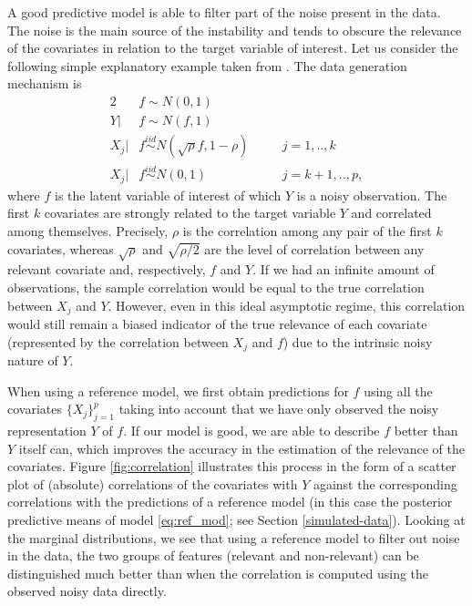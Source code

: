 \documentclass[american,]{article}
\theoremstyle{definition}
\begin{document}
A good predictive model is able to filter part of the noise present in
the data. The noise is the main source of the instability and tends to
obscure the relevance of the covariates in relation to the target
variable of interest. Let us consider the following simple
explanatory example taken from \cite{paper:projpred}. The data
generation mechanism is
\begin{alignat}{2} \label{eq:simulated_data}
     &f\sim N(0,1) && \nonumber \\ 
     Y|&f\sim N(f,1) && \\
     X_{j}|&f \overset{iid}{\sim} N(\sqrt{\rho}f,1-\rho) \quad &&j=1,..,k \nonumber \\
     X_{j}|&f \overset{iid}{\sim} N(0,1) &&j=k+1,..,p \nonumber,
\end{alignat}
where $f$ is the latent variable of interest of which $Y$ is a noisy
observation. The first $k$ covariates are strongly related to the
target variable $Y$ and correlated among themselves. Precisely, $\rho$
is the correlation among any pair of the first $k$ covariates, whereas
$\sqrt{\rho}$ and $\sqrt{\rho/2}$ are the level of correlation between
any relevant covariate and, respectively, $f$ and $Y$. If we had an
infinite amount of observations, the sample correlation would be equal
to the true correlation between $X_j$ and $Y$. However, even in this
ideal asymptotic regime, this correlation would still remain a biased
indicator of the true relevance of each covariate (represented by the
correlation between $X_j$ and $f$) due to the intrinsic noisy nature
of $Y$.

When using a reference model, we first obtain predictions for $f$
using all the covariates $\{X_{j}\}_{j=1}^{p}$ taking into account
that we have only observed the noisy representation $Y$ of $f$. If our
model is good, we are able to describe $f$ better than $Y$ itself can,
which improves the accuracy in the estimation of the relevance of the
covariates.  Figure \ref{fig:correlation} illustrates this process in
the form of a scatter plot of (absolute) correlations of the
covariates with $Y$ against the corresponding correlations with the
predictions of a reference model (in this case the posterior
predictive means of model \eqref{eq:ref_mod}; see Section
\ref{simulated-data}). Looking at the marginal distributions, we see
that using a reference model to filter out noise in the data, the two
groups of features (relevant and non-relevant) can be distinguished
much better than when the correlation is computed using the observed
noisy data directly.
\end{document}
